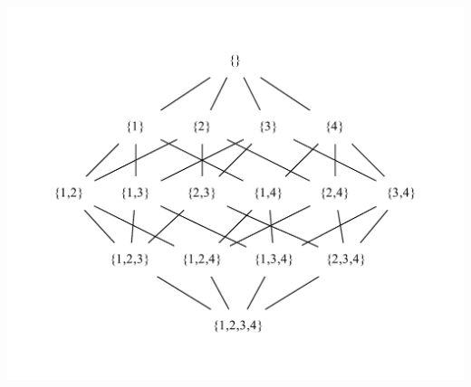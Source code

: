 \documentclass[UKenglish,usenames,dvipsnames,svgnames,table,aspectratio=169,mathserif]{beamer}
\begin{document}
\begin{frame}
\begin{columns}
\includegraphics[scale=0.65]{set/powerset.pdf}
\pause
{}

\end{columns}
\end{frame}
\end{document}
